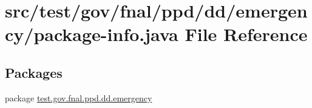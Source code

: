 \hypertarget{test_2gov_2fnal_2ppd_2dd_2emergency_2package-info_8java}{\section{src/test/gov/fnal/ppd/dd/emergency/package-\/info.java File Reference}
\label{test_2gov_2fnal_2ppd_2dd_2emergency_2package-info_8java}
}
\subsection*{Packages}
\begin{DoxyCompactItemize}
\item 
package \hyperlink{namespacetest_1_1gov_1_1fnal_1_1ppd_1_1dd_1_1emergency}{test.\-gov.\-fnal.\-ppd.\-dd.\-emergency}
\end{DoxyCompactItemize}
